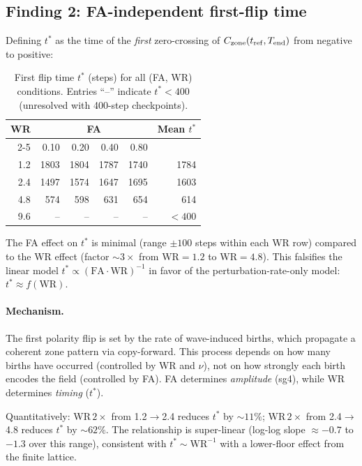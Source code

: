 \documentclass[11pt,a4paper]{article}
\begin{document}
\subsection{Finding 2: FA-independent first-flip time}

Defining $t^*$ as the time of the \emph{first} zero-crossing of
$C_{\rm zone}(t_{\rm ref}, T_{\rm end})$ from negative to positive:

\begin{table}[h]
\centering
\caption{First flip time $t^*$ (steps) for all (FA, WR) conditions.
         Entries ``--'' indicate $t^* < 400$ (unresolved with 400-step checkpoints).}
\label{tab:tstar}
\begin{tabular}{rrrrrr}
\toprule
\multirow{2}{*}{WR} & \multicolumn{4}{c}{FA} & \multirow{2}{*}{Mean $t^*$} \\
\cmidrule(lr){2-5}
 & 0.10 & 0.20 & 0.40 & 0.80 & \\
\midrule
1.2 & 1803 & 1804 & 1787 & 1740 & 1784 \\
2.4 & 1497 & 1574 & 1647 & 1695 & 1603 \\
4.8 &  574 &  598 &  631 &  654 &  614 \\
9.6 & -- & -- & -- & -- & $<400$ \\
\bottomrule
\end{tabular}
\end{table}

The FA effect on $t^*$ is minimal (range $\pm 100$ steps within each WR row)
compared to the WR effect (factor $\sim 3\times$ from WR$=1.2$ to WR$=4.8$).
This falsifies the linear model $t^* \propto (\mathrm{FA} \cdot \mathrm{WR})^{-1}$
in favor of the perturbation-rate-only model: $t^* \approx f(\mathrm{WR})$.

\paragraph{Mechanism.}
The first polarity flip is set by the rate of wave-induced births, which
propagate a coherent zone pattern via copy-forward.  This process depends on
how many births have occurred (controlled by WR and $\nu$), not on how
strongly each birth encodes the field (controlled by FA).  FA determines
\emph{amplitude} (sg4), while WR determines \emph{timing} ($t^*$).

Quantitatively: WR$\,2\times$ from 1.2$\to$2.4 reduces $t^*$ by $\sim 11\%$;
WR$\,2\times$ from 2.4$\to$4.8 reduces $t^*$ by $\sim 62\%$.  The relationship
is super-linear (log-log slope $\approx -0.7$ to $-1.3$ over this range),
consistent with $t^* \sim \mathrm{WR}^{-1}$ with a lower-floor effect from the
finite lattice.
\end{document}
